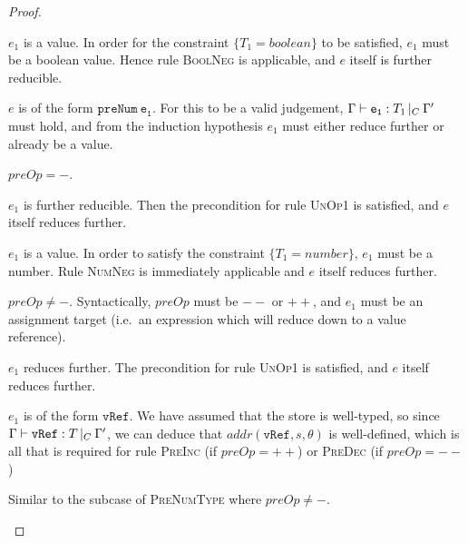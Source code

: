 \documentclass[a4paper]{article}
\theoremstyle{definition}
\theoremstyle{dotless}
\begin{document}
\begin{proof}
\begin{case}[NegType]
	\begin{subcase}
	  $e_1$ is a value.
	  In order for the constraint $\{T_1=boolean\}$ to be
	  satisfied, $e_1$ must be a boolean value. Hence 
	  rule \textsc{BoolNeg} is applicable, and $e$ itself is further reducible.
	\end{subcase}
  \end{case}

  \begin{case}[PreNumType]\label{prenumtype}

	$e$ is of the form $\mathtt{preNum\ e_1}$. For this to be a valid judgement,
	$\Gamma{}\vdash\mathtt{e_1}: T_1\,|_C\:\Gamma'$ must hold, and from the induction hypothesis $e_1$ must
	either reduce further or already be a value.

	\begin{subcase}
	  $preOp=-$. 

	  \begin{subcase}
	  	$e_1$ is further reducible.
	  	Then the precondition for rule \textsc{UnOp1}
	  	is satisfied, and $e$ itself reduces further.
	  \end{subcase}

	  \begin{subcase}
	  	$e_1$ is a value.
	  	In order to satisfy the constraint $\{T_1=number\}$,
	  	$e_1$ must be a number. Rule \textsc{NumNeg} is immediately applicable
	  	and $e$ itself reduces further.
	  \end{subcase}

	\end{subcase}

	\begin{subcase}
	  $preOp\neq-$. 
	  Syntactically, $preOp$ must be $\mathtt{--}$ or $\mathtt{++}$, and $e_1$
	  must be an assignment target (i.e.\ an expression which will reduce down
	  to a value reference).

	  \begin{subcase}
		$e_1$ reduces further. 
		The precondition for rule \textsc{UnOp1} is satisfied, and $e$ itself
		reduces further.
	  \end{subcase}

	  \begin{subcase}
		$e_1$ is of the form $\mathtt{vRef}$.
		We have assumed that the store is well-typed, so since
		$\Gamma{}\vdash\mathtt{vRef}: T\,|_C\:\Gamma'$, we can deduce that $addr(\mathtt{vRef}, s, \theta)$
		is well-defined, which is all that is required for rule \textsc{PreInc}
		(if $preOp = ++$) or \textsc{PreDec} (if $preOp=--$)
	  \end{subcase}

	\end{subcase}

  \end{case}

  \begin{case}[PostOpType]\label{postoptype}

  	Similar to the subcase of \textsc{PreNumType} where $preOp\neq-$.

  \end{case}

\end{proof}
\end{document}
